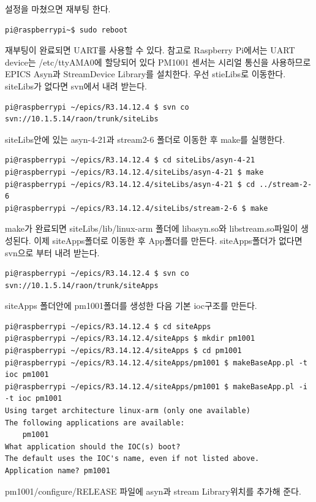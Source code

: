 \documentclass[11pt
  , a4paper
  , article
  , oneside
]{memoir}
\begin{document}
설정을 마쳤으면 재부팅 한다. 
\begin{lstlisting}[style=termstyle]
pi@raspberrypi~$ sudo reboot
\end{lstlisting}
재부팅이 완료되면 UART를 사용할 수 있다. 참고로 Raspberry Pi에서는 UART device는 /etc/ttyAMA0에 할당되어
있다 PM1001 센서는 시리얼 통신을 사용하므로 EPICS Asyn과 StreamDevice Library를 설치한다.
우선 stieLibs로 이동한다. siteLibs가 없다면 svn에서 내려 받는다.
\begin{lstlisting}[style=termstyle]
pi@raspberrypi ~/epics/R3.14.12.4 $ svn co svn://10.1.5.14/raon/trunk/siteLibs
\end{lstlisting}
siteLibs안에 있는 asyn-4-21과 stream2-6 폴더로 이동한 후 make를 실행한다.
\begin{lstlisting}[style=termstyle]
pi@raspberrypi ~/epics/R3.14.12.4 $ cd siteLibs/asyn-4-21
pi@raspberrypi ~/epics/R3.14.12.4/siteLibs/asyn-4-21 $ make
pi@raspberrypi ~/epics/R3.14.12.4/siteLibs/asyn-4-21 $ cd ../stream-2-6
pi@raspberrypi ~/epics/R3.14.12.4/siteLibs/stream-2-6 $ make
\end{lstlisting}
make가 완료되면 siteLibs/lib/linux-arm 폴더에 libasyn.so와 libstream.so파일이 생성된다.
이제 siteApps폴더로 이동한 후 App폴더를 만든다. siteApps폴더가 없다면 svn으로 부터 내려 받는다.
\begin{lstlisting}[style=termstyle]
pi@raspberrypi ~/epics/R3.14.12.4 $ svn co svn://10.1.5.14/raon/trunk/siteApps
\end{lstlisting}
siteApps 폴더안에 pm1001폴더를 생성한 다음 기본 ioc구조를 만든다.
\begin{lstlisting}[style=termstyle]
pi@raspberrypi ~/epics/R3.14.12.4 $ cd siteApps
pi@raspberrypi ~/epics/R3.14.12.4/siteApps $ mkdir pm1001
pi@raspberrypi ~/epics/R3.14.12.4/siteApps $ cd pm1001
pi@raspberrypi ~/epics/R3.14.12.4/siteApps/pm1001 $ makeBaseApp.pl -t ioc pm1001
pi@raspberrypi ~/epics/R3.14.12.4/siteApps/pm1001 $ makeBaseApp.pl -i -t ioc pm1001
Using target architecture linux-arm (only one available)
The following applications are available:
    pm1001
What application should the IOC(s) boot?
The default uses the IOC's name, even if not listed above.
Application name? pm1001
\end{lstlisting}
pm1001/configure/RELEASE 파일에 asyn과 stream Library위치를 추가해 준다.
\end{document}
